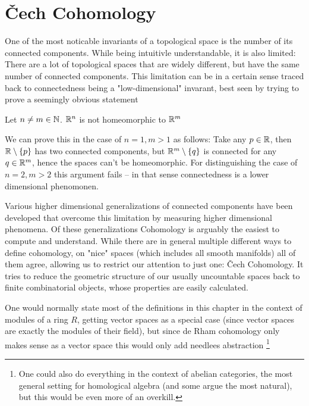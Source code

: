\chapter{Čech Cohomology}
One of the most noticable invariants of a topological space is the number of its connected components.
While being intuitivle understandable, it is also limited: There are a lot of topological spaces that are
widely different, but have the same number of connected components. This limitation can be in a certain sense
traced back to connectedness being a "low-dimensional" invarant, best seen by trying to prove a seemingly obvious statement
\begin{theorem}
	Let $n \neq m \in \mathbb{N}$. $\mathbb{R}^n$ is not homeomorphic to $\mathbb{R}^m$
\end{theorem}
We can prove this in the case of $n = 1, m > 1$ as follows: Take any $p \in \mathbb{R}$, then $\mathbb{R} \setminus \{p\}$ has
two connected components, but $\mathbb{R}^m \setminus \{q\}$ is connected for any $q \in \mathbb{R}^m$, hence the spaces can't
be homeomorphic. For distinguishing the case of $n = 2, m > 2$ this argument fails – in that sense connectedness
is a lower dimensional phenomonen.

Various higher dimensional generalizations of connected components have been developed
that overcome this limitation by measuring higher dimensional phenomena. Of these generalizations
Cohomology is arguably the easiest to compute and understand. While there are in general multiple different
ways to define cohomology, on "nice" spaces (which includes all smooth manifolds) all of them agree, allowing
us to restrict our attention to just one: Čech Cohomology. It tries to reduce the geometric structure of our
usually uncountable spaces back to finite combinatorial objects, whose properties are easily calculated.

\begin{remark}
One would normally state most of the definitions in this chapter in
the context of modules of a ring $R$, getting vector spaces as a special
case (since vector spaces are exactly the modules of their field),
but since de Rham cohomology only makes sense as a vector space this
would only add needlees abstraction \footnote{
	One could also do everything in the context of abelian categories,
	the most general setting for homological algebra
	(and some argue the most natural), but this would be even more of an
	overkill.
}
\end{remark}

